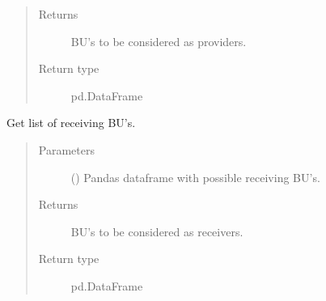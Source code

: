 \documentclass[letterpaper,10pt,english]{sphinxmanual}
\begin{document}
\begin{fulllineitems}
\begin{fulllineitems}
\begin{quote}
\begin{description}
\item[{Returns}] \leavevmode
{} \textendash{} BU’s to be considered as providers.

\item[{Return type}] \leavevmode
pd.DataFrame

\end{description}\end{quote}

\end{fulllineitems}


\begin{fulllineitems}
\label{\detokenize{source/optimization:optimization.solspace.SolutionSpace._get_receiving}}
Get list of receiving BU’s.
\begin{quote}\begin{description}
\item[{Parameters}] \leavevmode
{} () \textendash{} Pandas dataframe with possible receiving BU’s.

\item[{Returns}] \leavevmode
{} \textendash{} BU’s to be considered as receivers.

\item[{Return type}] \leavevmode
pd.DataFrame

\end{description}\end{quote}

\end{fulllineitems}



\end{fulllineitems}
\end{document}
